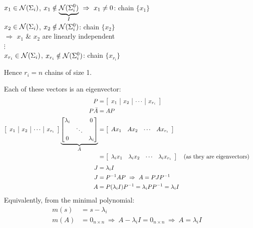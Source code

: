\begin{minipage}[c]{0.24\textwidth}
\centering
{}
\end{minipage}\hfill
\begin{minipage}[c]{0.73\textwidth}
$x_1\in\mathcal{N}(\Sigma_i)$, \quad $x_1\notin\underbrace{\Null(\Sigma_i^0)}_{I}\ \Rightarrow\ x_1\neq 0$: \quad chain $\{x_1\}$\\
$x_2\in\mathcal{N}(\Sigma_i)$, \quad $x_2\notin\mathcal{N}(\Sigma_i^0)$: \quad chain $\{x_2\}$\\
\qquad $\Rightarrow$ $x_1$ \& $x_2$ are linearly independent\\
\quad$\vdots$\\
$x_{r_i}\in\mathcal{N}(\Sigma_i)$, \quad $x_{r_i}\notin\mathcal{N}(\Sigma_i^0)$: \quad chain $\{x_{r_i}\}$

Hence $r_i=n$ chains of size 1.
\end{minipage}

Each of these vectors is an eigenvector:
\begin{align*}
P&=\left[\begin{array}{c|c|c|c}x_1&x_2&\cdots&x_{r_i}\end{array}\right]\\
P\bar A&=AP\\
\left[\begin{array}{c|c|c|c}x_1&x_2&\cdots&x_{r_i}\end{array}\right]
\underbrace{\begin{bmatrix}\lambda_i&&0\\&\ddots&\\0&&\lambda_i\end{bmatrix}}_{\bar A}
&=\left[\begin{array}{cccc}Ax_1&Ax_2&\cdots&Ax_{r_i}\end{array}\right]\\
&=\left[\begin{array}{cccc}\lambda_ix_1&\lambda_ix_2&\cdots&\lambda_ix_{r_i}\end{array}\right]
\quad\text{(as they are eigenvectors)}\\[4pt]
J&=\lambda_iI\\
J&=P^{-1}AP\ \Rightarrow\ A=PJP^{-1}\\
A&=P(\lambda_iI)P^{-1}=\lambda_iPP^{-1}=\lambda_iI
\end{align*}
Equivalently, from the minimal polynomial:
\begin{align*}
m(s)&=s-\lambda_i\\
m(A)&=0_{n\times n}\ \Rightarrow\ A-\lambda_iI=0_{n\times n}\ \Rightarrow\ A=\lambda_iI
\end{align*}


